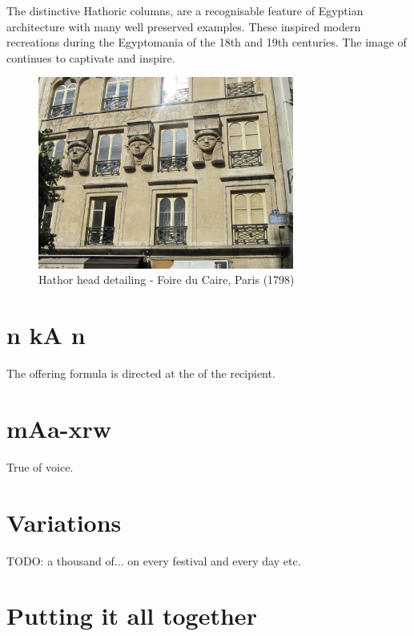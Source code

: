 The distinctive Hathoric columns, are a recognisable feature of Egyptian architecture with many well preserved examples. These inspired modern recreations during the Egyptomania of the 18th and 19th centuries. The image of  continues to captivate and inspire.

\begin{figure} [H]
	\centering
	\includegraphics[width=0.75\textwidth]{../photos/Place_du_Caire}
	\caption{Hathor head detailing - Foire du Caire, Paris (1798)}
\end{figure}

\section*{n kA n}

The offering formula is directed at the  of the recipient.

\section*{mAa-xrw}

True of voice.

\section*{Variations}

TODO: a thousand of... on every festival and every day etc.

\section*{Putting it all together}

